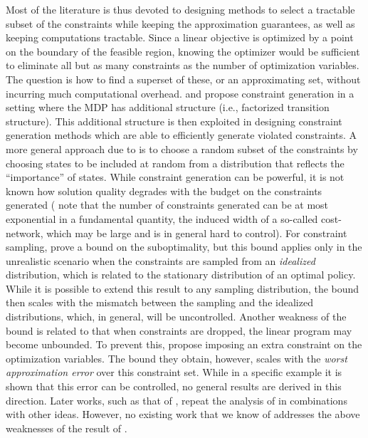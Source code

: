 Most of the literature is thus devoted to designing methods to select a tractable subset of the constraints while keeping the approximation guarantees, as well as keeping computations tractable. 
Since a linear objective is optimized by a point on the boundary of the feasible region, 
knowing the optimizer would be sufficient to eliminate all but 
as many constraints as the number of optimization variables.
The question is how to find a superset of these, or an approximating set, without incurring much computational overhead.
\citet{schuurmans} and \citet{gkp} propose constraint generation in a setting 
where the MDP has additional structure (i.e., factorized transition structure).
This additional structure is then exploited in designing constraint generation methods which are able to efficiently generate
violated constraints. A more general approach due to \citet{CS} 
is to choose a random subset of the constraints 
by choosing states to be included at random from a distribution that reflects the ``importance'' of states.
While constraint generation can be powerful,
it is not known how solution quality degrades with the budget on the constraints generated
(\citeauthor{gkp} note that the number of constraints generated can be at most exponential in a fundamental quantity,
the induced width of a so-called cost-network, which may be large and is in general hard to control).
For constraint sampling,  \citet{CS} prove a bound on the suboptimality, but this bound applies only 
in the unrealistic scenario when the constraints are sampled from an \emph{idealized} distribution,
which is related to the stationary distribution of an optimal policy. 
While it is possible to extend this result
to any sampling distribution, the bound then scales with the mismatch between the sampling and the idealized
distributions, which, in general, will be uncontrolled. 
Another weakness of the bound is related to that when constraints are dropped, the linear program may become
unbounded. To prevent this, \citet{CS}  propose imposing an extra constraint on the optimization variables.
The bound they obtain, however, scales with the \emph{worst approximation error} over this constraint set.
While in a specific example it is shown that this error can be controlled, no general results are derived in this direction.
Later works, such as that of
\citet{SALP,BhatFaMo12:SALPNP},  repeat the analysis of \citet{CS}
in combinations with other ideas. However, no existing work that we know of addresses the above weaknesses of the result of \citet{CS}. 

